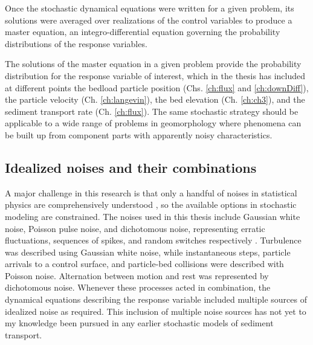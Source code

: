 Once the stochastic dynamical equations were written for a given problem, its solutions were averaged over realizations of the control variables to produce a master equation, an integro-differential equation governing the probability distributions of the response variables.

The solutions of the master equation in a given problem provide the probability distribution for the response variable of interest, which in the thesis has included at different points the bedload particle position (Chs. \ref{ch:flux} and \ref{ch:downDiff}), the particle velocity (Ch. \ref{ch:langevin}), the bed elevation (Ch. \ref{ch:ch3}), and the sediment transport rate (Ch. \ref{ch:flux}).
The same stochastic strategy should be applicable to a wide range of problems in geomorphology where phenomena can be built up from component parts with apparently noisy characteristics.


\subsection{Idealized noises and their combinations}

A major challenge in this research is that only a handful of noises in statistical physics are comprehensively understood \citep{Horsthemke1984}, so the available options in stochastic modeling are constrained.
The noises used in this thesis include Gaussian white noise, Poisson pulse noise, and dichotomous noise, representing erratic fluctuations, sequences of spikes, and random switches respectively \citep{VanDenBroeck1983}.
Turbulence was described using Gaussian white noise, while instantaneous steps, particle arrivals to a control surface, and particle-bed collisions were described with Poisson noise. Alternation between motion and rest was represented by dichotomous noise.
Whenever these processes acted in combination, the dynamical equations describing the response variable included multiple sources of idealized noise as required.
This inclusion of multiple noise sources has not yet to my knowledge been pursued in any earlier stochastic models of sediment transport.

